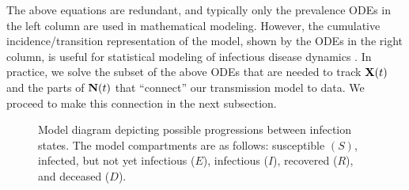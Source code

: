 The above equations are redundant, and typically only the prevalence ODEs in the left column are used in mathematical modeling.
However, the cumulative incidence/transition representation of the model, shown by the ODEs in the right column, is useful for statistical modeling of infectious disease dynamics \citep{breto2011compound}.
In practice, we solve the subset of the above ODEs that are needed to track $\mathbf{X}(t)$ and the parts of $\mathbf{N}(t)$ that ``connect'' our transmission model to data.
We proceed to make this connection in the next subsection.


\begin{figure}
    \centering
\caption[SEIRD model.]{Model diagram depicting possible progressions between infection states. The model compartments are as follows: susceptible $ (S) $, infected, but not yet infectious ($ E $), infectious ($I$), recovered ($ R $), and deceased ($ D $). }
	\label{ch_4:fig:seiird}
\end{figure}

